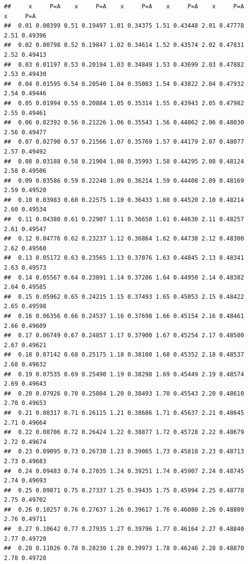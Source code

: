 \documentclass[onecolumn,12pt]{book}\usepackage[]{graphicx}\usepackage[]{color}
\makeatletter
\newenvironment{kframe}{%
 \def\at@end@of@kframe{}%
 \ifinner\ifhmode%
  \def\at@end@of@kframe{\end{minipage}}%
  \begin{minipage}{\columnwidth}%
 \fi\fi%
 \def\FrameCommand##1{\hskip\@totalleftmargin \hskip-\fboxsep
 \colorbox{shadecolor}{##1}\hskip-\fboxsep
     \hskip-\linewidth \hskip-\@totalleftmargin \hskip\columnwidth}%
 \MakeFramed {\advance\hsize-\width
   \@totalleftmargin\z@ \linewidth\hsize
   \@setminipage}}%
 {\par\unskip\endMakeFramed%
 \at@end@of@kframe}
\newenvironment{knitrout}{}{} %
\makeatother
\begin{document}
\begin{knitrout}
\color{fgcolor}\begin{kframe}
\begin{verbatim}
##     x     P=A    x     P=A    x     P=A    x     P=A    x     P=A    x     P=A
##  0.01 0.00399 0.51 0.19497 1.01 0.34375 1.51 0.43448 2.01 0.47778 2.51 0.49396
##  0.02 0.00798 0.52 0.19847 1.02 0.34614 1.52 0.43574 2.02 0.47831 2.52 0.49413
##  0.03 0.01197 0.53 0.20194 1.03 0.34849 1.53 0.43699 2.03 0.47882 2.53 0.49430
##  0.04 0.01595 0.54 0.20540 1.04 0.35083 1.54 0.43822 2.04 0.47932 2.54 0.49446
##  0.05 0.01994 0.55 0.20884 1.05 0.35314 1.55 0.43943 2.05 0.47982 2.55 0.49461
##  0.06 0.02392 0.56 0.21226 1.06 0.35543 1.56 0.44062 2.06 0.48030 2.56 0.49477
##  0.07 0.02790 0.57 0.21566 1.07 0.35769 1.57 0.44179 2.07 0.48077 2.57 0.49492
##  0.08 0.03188 0.58 0.21904 1.08 0.35993 1.58 0.44295 2.08 0.48124 2.58 0.49506
##  0.09 0.03586 0.59 0.22240 1.09 0.36214 1.59 0.44408 2.09 0.48169 2.59 0.49520
##  0.10 0.03983 0.60 0.22575 1.10 0.36433 1.60 0.44520 2.10 0.48214 2.60 0.49534
##  0.11 0.04380 0.61 0.22907 1.11 0.36650 1.61 0.44630 2.11 0.48257 2.61 0.49547
##  0.12 0.04776 0.62 0.23237 1.12 0.36864 1.62 0.44738 2.12 0.48300 2.62 0.49560
##  0.13 0.05172 0.63 0.23565 1.13 0.37076 1.63 0.44845 2.13 0.48341 2.63 0.49573
##  0.14 0.05567 0.64 0.23891 1.14 0.37286 1.64 0.44950 2.14 0.48382 2.64 0.49585
##  0.15 0.05962 0.65 0.24215 1.15 0.37493 1.65 0.45053 2.15 0.48422 2.65 0.49598
##  0.16 0.06356 0.66 0.24537 1.16 0.37698 1.66 0.45154 2.16 0.48461 2.66 0.49609
##  0.17 0.06749 0.67 0.24857 1.17 0.37900 1.67 0.45254 2.17 0.48500 2.67 0.49621
##  0.18 0.07142 0.68 0.25175 1.18 0.38100 1.68 0.45352 2.18 0.48537 2.68 0.49632
##  0.19 0.07535 0.69 0.25490 1.19 0.38298 1.69 0.45449 2.19 0.48574 2.69 0.49643
##  0.20 0.07926 0.70 0.25804 1.20 0.38493 1.70 0.45543 2.20 0.48610 2.70 0.49653
##  0.21 0.08317 0.71 0.26115 1.21 0.38686 1.71 0.45637 2.21 0.48645 2.71 0.49664
##  0.22 0.08706 0.72 0.26424 1.22 0.38877 1.72 0.45728 2.22 0.48679 2.72 0.49674
##  0.23 0.09095 0.73 0.26730 1.23 0.39065 1.73 0.45818 2.23 0.48713 2.73 0.49683
##  0.24 0.09483 0.74 0.27035 1.24 0.39251 1.74 0.45907 2.24 0.48745 2.74 0.49693
##  0.25 0.09871 0.75 0.27337 1.25 0.39435 1.75 0.45994 2.25 0.48778 2.75 0.49702
##  0.26 0.10257 0.76 0.27637 1.26 0.39617 1.76 0.46080 2.26 0.48809 2.76 0.49711
##  0.27 0.10642 0.77 0.27935 1.27 0.39796 1.77 0.46164 2.27 0.48840 2.77 0.49720
##  0.28 0.11026 0.78 0.28230 1.28 0.39973 1.78 0.46246 2.28 0.48870 2.78 0.49728

\end{verbatim}
\end{kframe}
\end{knitrout}
\end{document}
